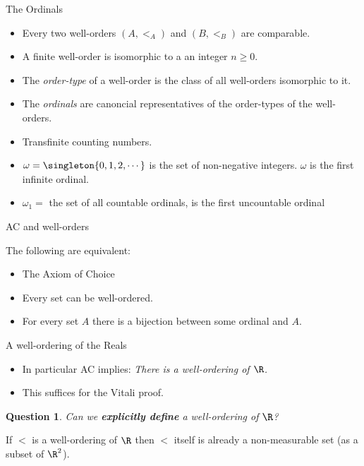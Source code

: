 \documentclass{beamer}
\newtheorem*{question}{Question}
\begin{document}
\begin{frame}{The Ordinals}

\begin{itemize}
  \item  Every two well-orders $(A, <_A)$ and $(B, <_B)$ are comparable.
  \item  A finite well-order is isomorphic to a an integer $n\geq 0$.
  \item The \emph{order-type} of a well-order is the class of all well-orders
  isomorphic to it.
  \item The \emph{ordinals} are canoncial representatives of the
    order-types of the well-orders.
  \item Transfinite counting numbers.
  \item $\omega = \singleton{0, 1, 2, \cdots }$ is the set of non-negative
    integers. $\omega$ is the first infinite ordinal.
  \item  $\omega_1 = $ the set of all countable ordinals, is the first
    uncountable ordinal
\end{itemize}

\end{frame}

\begin{frame}{AC and well-orders}

The following are equivalent:
\begin{itemize}
  \item  The Axiom of Choice
  \item  Every set can be well-ordered.
  \item For every set $A$ there is a bijection between some ordinal and $A$.
\end{itemize}

\end{frame}

\begin{frame}{A well-ordering of the Reals}

\begin{itemize}
  \item  In particular AC implies: \emph{There is a well-ordering of $\R$.}
  \item  This suffices for the Vitali proof.
\end{itemize}

\begin{question}
Can we \textbf{explicitly define} a well-ordering of $\R$?
\end{question}

\begin{fact}
If $<$ is a well-ordering of $\R$ then $<$ itself is
already a non-measurable set (as a subset of $\R^2$).
\end{fact}

\end{frame}
\end{document}
